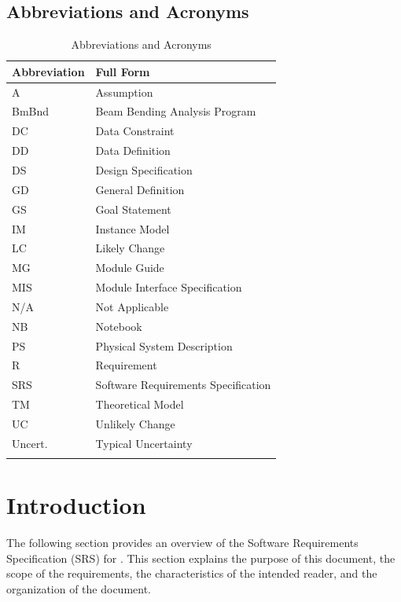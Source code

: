 \documentclass[12pt]{article}
\begin{document}
\subsection{Abbreviations and Acronyms}
\label{Sec:TAbbAcc}
\begin{longtable}{l l}
\toprule
\textbf{Abbreviation} & \textbf{Full Form}
\\
\midrule
\endhead
A & Assumption
\\
BmBnd & Beam Bending Analysis Program
\\
DC & Data Constraint
\\
DD & Data Definition
\\
DS & Design Specification
\\
GD & General Definition
\\
GS & Goal Statement
\\
IM & Instance Model
\\
LC & Likely Change
\\
MG & Module Guide
\\
MIS & Module Interface Specification
\\
N/A & Not Applicable
\\
NB & Notebook
\\
PS & Physical System Description
\\
R & Requirement
\\
SRS & Software Requirements Specification
\\
TM & Theoretical Model
\\
UC & Unlikely Change
\\
Uncert. & Typical Uncertainty
\\
\bottomrule
\caption{Abbreviations and Acronyms}
\label{Table:TAbbAcc}
\end{longtable}
\section{Introduction}
\label{Sec:Intro}


The following section provides an overview of the Software Requirements Specification (SRS) for . This section explains the purpose of this document, the scope of the requirements, the characteristics of the intended reader, and the organization of the document.
\end{document}
